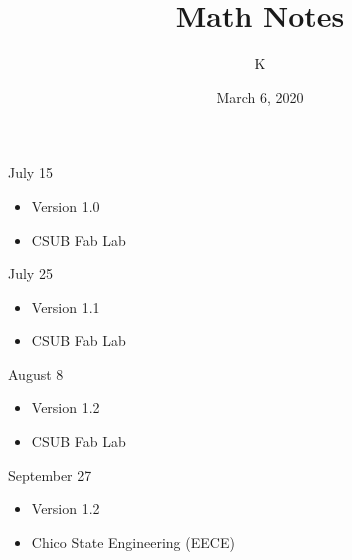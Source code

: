 \documentclass[10pt, letterpaper]{article}
\title{Math Notes}
\author{K}
\date{March 6, 2020}
\begin{document}
\begin{comment}
\begin{titlepage}
    \maketitle
\end{titlepage}
\end{comment}





{} July 15
\vspace{-5 pt}
\begin{itemize}
	\item Version 1.0
	\vspace{-10 pt}
	\item CSUB Fab Lab
\end{itemize}

 July 25
\vspace{-5 pt}
\begin{itemize}
	\item Version 1.1
	\vspace{-10 pt}
	\item CSUB Fab Lab
\end{itemize}

 August 8
\vspace{-5 pt}
\begin{itemize}
	\item Version 1.2
	\vspace{-10 pt}
	\item CSUB Fab Lab
\end{itemize}

 September 27
\vspace{-5 pt}
\begin{itemize}
	\item Version 1.2
	\vspace{-10 pt}
	\item Chico State Engineering (EECE)
\end{itemize}
\end{document}
